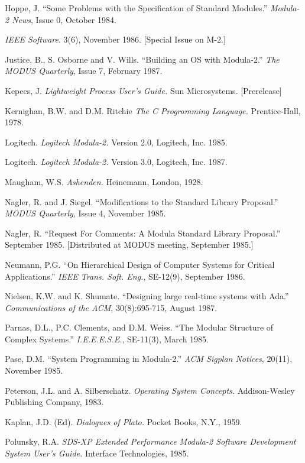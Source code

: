 Hoppe, J. ``Some Problems with the Specification of Standard Modules.''
{\em Modula-2 News}, Issue 0, October 1984.
\smallskip

{\em IEEE Software}. 3(6), November 1986. [Special Issue on M-2.]
\smallskip

Justice, B., S. Osborne and V. Wills. ``Building an OS with Modula-2.''
{\em The MODUS Quarterly}, Issue 7, February 1987.
\smallskip

Kepecs, J. {\em Lightweight Process User's Guide.} Sun Microsystems.
[Prerelease]
\smallskip

Kernighan, B.W. and D.M. Ritchie {\em The C Programming Language.}
Prentice-Hall, 1978.
\smallskip

Logitech.  {\em Logitech Modula-2.} Version 2.0, Logitech, Inc. 1985.
\smallskip

Logitech.  {\em Logitech Modula-2.} Version 3.0, Logitech, Inc. 1987.
\smallskip

Maugham, W.S. {\em Ashenden.} Heinemann, London, 1928.
\smallskip

Nagler, R. and J. Siegel. ``Modifications to the Standard Library Proposal.''
{\em MODUS Quarterly}, Issue 4, November 1985.
\smallskip

Nagler, R. ``Request For Comments: A Modula Standard Library Proposal.''
September 1985.  [Distributed at MODUS meeting, September 1985.]

Neumann, P.G. ``On Hierarchical Design of Computer Systems for Critical
Applications.'' {\em IEEE Trans. Soft. Eng.}, SE-12(9), September 1986.
\smallskip

Nielsen, K.W. and K. Shumate. ``Designing large real-time systems with Ada.''
{\em Communications of the ACM}, 30(8):695-715, August 1987.
\smallskip

Parnas, D.L., P.C. Clements, and D.M. Weiss. ``The Modular Structure of Complex 
Systems.'' {\em I.E.E.E.S.E.}, SE-11(3), March 1985.
\smallskip

Pase, D.M. ``System Programming in Modula-2.'' {\em ACM Sigplan Notices},
20(11), November 1985.
\smallskip

Peterson, J.L. and A. Silberschatz.  {\em Operating System Concepts.}
Addison-Wesley Publishing Company, 1983.
\smallskip

Kaplan, J.D. (Ed). {\em Dialogues of Plato.} Pocket Books, N.Y., 1959.
\smallskip
 
Polunsky, R.A.  {\em SDS-XP Extended Performance Modula-2 Software 
Development System User's Guide.} Interface Technologies, 1985.
\smallskip

